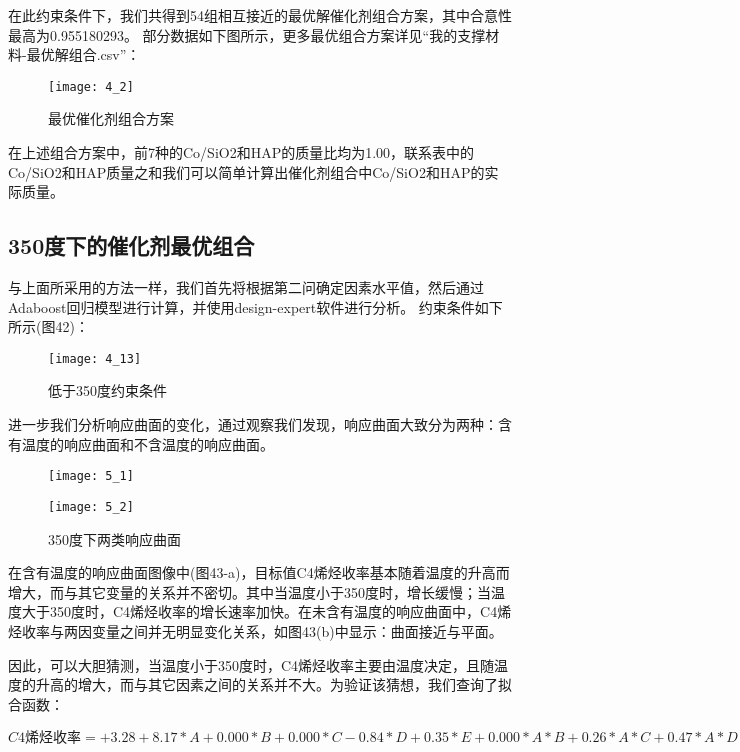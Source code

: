 \documentclass[withoutpreface,bwprint]{cumcmthesis} %
\begin{document}
在此约束条件下，我们共得到54组相互接近的最优解催化剂组合方案，其中合意性最高为0.955180293。
部分数据如下图所示，更多最优组合方案详见“我的支撑材料-最优解组合.csv”：

\begin{figure}[!h]
	\centering
	\texttt{[image: 4\_2]}
	\caption{最优催化剂组合方案}
	\label{fig:circuit-diagram1}
\end{figure}
在上述组合方案中，前7种的Co/SiO2和HAP的质量比均为1.00，联系表中的Co/SiO2和HAP质量之和我们可以简单计算出催化剂组合中Co/SiO2和HAP的实际质量。

\subsection{350度下的催化剂最优组合}
与上面所采用的方法一样，我们首先将根据第二问确定因素水平值，然后通过Adaboost回归模型进行计算，并使用design-expert软件进行分析。
约束条件如下所示(图42)：

\begin{figure}[!h]
	\centering
	\texttt{[image: 4\_13]}
	\caption{低于350度约束条件}
	\label{fig:circuit-diagram1}
\end{figure}


进一步我们分析响应曲面的变化，通过观察我们发现，响应曲面大致分为两种：含有温度的响应曲面和不含温度的响应曲面。
\begin{figure}[!h]
	\centering
	\begin{minipage}[c]{0.45\textwidth}
		\centering
		\texttt{[image: 5\_1]}
		\label{fig:sample-figure-a}
	\end{minipage}
	\begin{minipage}[c]{0.45\textwidth}
		\centering
		\texttt{[image: 5\_2]}
		\label{fig:sample-figure-b}
	\end{minipage}
	\caption{350度下两类响应曲面}
	\label{fig:sample-figure}
\end{figure}
在含有温度的响应曲面图像中(图43-a)，目标值C4烯烃收率基本随着温度的升高而增大，而与其它变量的关系并不密切。其中当温度小于350度时，增长缓慢；当温度大于350度时，C4烯烃收率的增长速率加快。在未含有温度的响应曲面中，C4烯烃收率与两因变量之间并无明显变化关系，如图43(b)中显示：曲面接近与平面。

因此，可以大胆猜测，当温度小于350度时，C4烯烃收率主要由温度决定，且随温度的升高的增大，而与其它因素之间的关系并不大。为验证该猜想，我们查询了拟合函数：

$C4\text{烯烃收率}	 =
+3.28
+8.17	 * A
+0.000	 * B
+0.000	 * C
-0.84	 * D
+0.35	 * E
+0.000	 * A * B
+0.26	 * A * C
+0.47	 * A * D
+3.08	 * A * E
-0.18	 * B * C
+0.000	 * B * D
+0.000	 * B * E
+0.025	 * C * D
+0.000	 * C * E
+0.35	 * D * E
+5.98	 * A^2
-0.021	 * B^2
-0.021	 * C^2
-0.25	 * D^2
-0.35	 * E^2
+0.000	 * A^2 * B
+0.26	 * A^2 * C
+0.50	 * A^2 * D
+2.73	 * A^2 * E
-3.08	 * A * B^2
-2.82	 * A * C^2
-3.19	 * A * D^2
+0.18	 * B^2 * C
+0.35	 * B^2 * D
+0.018	 * B^2 * E
+0.18	 * B * C^2
+0.000	 * B * D^2
+0.38	 * C^2 * D
+0.018	 * C^2 * E
-0.025	 * C * D^2
-3.41	 * A^2 * B^2
-3.15	 * A^2 * C^2
-2.94	 * A^2 * D^2
-0.14	 * B^2 * C^2
+0.025	 * B^2 * D^2
$
\end{document}
